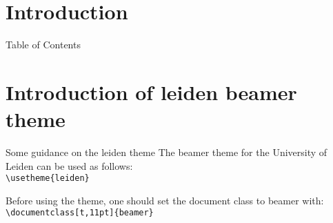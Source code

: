 
\batchmode %

\nonstopmode %


\section*{Introduction}

{
\begin{frame}[plain]
  \maketitle
\end{frame}
\addtocounter{framenumber}{-1}%
}

\begin{frame}{Table of Contents}
  \tableofcontents[sectionstyle=show/show, hideallsubsections]
\end{frame}


\section{Introduction of leiden beamer theme}

\begin{frame}[fragile]{Some guidance on the leiden theme}
The beamer theme for the University of Leiden can be used as follows:\\
\verb|\usetheme{leiden}|\\
\vspace{\baselineskip}

Before using the theme, one should set the document class to beamer
with:\\
\verb|\documentclass[t,11pt]{beamer}|
\end{frame}

